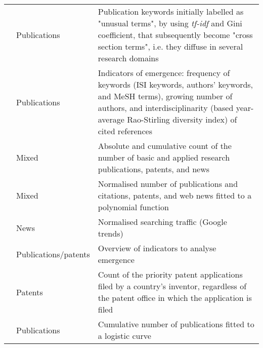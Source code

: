 \documentclass[11pt]{article}
\begin{document}
{\begin{landscape}
\begin{spacing}{0.8}
\begin{longtable}{p{6cm}p{2.7cm}p{13cm}}
\addtolength{\leftskip}{1em}\noindent		\cite{Schiebel2010,Roche2010} &  Publications			& Publication keywords initially labelled as "unusual terms", by using \textit{tf-idf} and Gini coefficient, that subsequently become "cross section terms", i.e. they diffuse in several research domains\\ [1ex]
\addtolength{\leftskip}{1em}\noindent		\cite{Guo2011}&	  		Publications			& Indicators of emergence: frequency of keywords (ISI keywords, authors' keywords, and MeSH terms), growing number of authors, and interdisciplinarity (based year-average Rao-Stirling diversity index) of cited references\\ [1ex]
\addtolength{\leftskip}{1em}\noindent		\cite{Jarvenpaa2011}&  		Mixed				& Absolute and cumulative count of the number of basic and applied research publications, patents, and news\\ [1ex]
\addtolength{\leftskip}{1em}\noindent		\cite{Abercrombie2012}&  		Mixed				&Normalised number of publications and citations, patents, and web news fitted to a polynomial function\\ [1ex]
\addtolength{\leftskip}{1em}\noindent		\cite{Jun2012,Jun2014}&  			News			& Normalised searching traffic (Google trends)\\ [1ex]
\addtolength{\leftskip}{1em}\noindent		\cite{Avila-Robinson2013a,Avila-Robinson2013}&  Publications/patents &  Overview of indicators to analyse emergence\\ [1ex]
\addtolength{\leftskip}{1em}\noindent		\cite{DeRassenfosse2013}&  	Patents				& Count of the priority patent applications filed by a country's inventor, regardless of the patent office in which the application is filed \\ [1ex]
\addtolength{\leftskip}{1em}\noindent		\cite{Ho2014}&  			Publications			& Cumulative number of publications fitted to a logistic curve\\ [1ex]
\hline



\end{longtable}
\end{spacing}
\end{landscape}}
\end{document}
